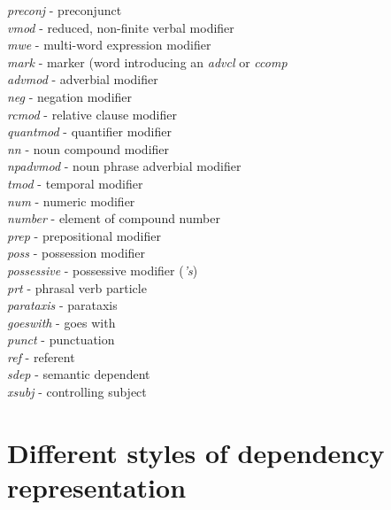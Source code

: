 \documentclass[11pt,letterpaper]{article}
\begin{document}
\begin{tabbing}
    \> \> \emph{preconj} - preconjunct \\
    \> \> \emph{vmod} - reduced, non-finite verbal modifier \\
    \> \> \emph{mwe} - multi-word expression modifier \\
    \> \> \> \emph{mark} - marker (word introducing an \emph{advcl} or
    \emph{ccomp} \\
    \> \> \emph{advmod} - adverbial modifier \\
    \> \>  \> \emph{neg} - negation modifier \\
    \> \> \emph{rcmod} - relative clause modifier \\
    \> \> \emph{quantmod} - quantifier modifier\\
   \> \> \emph{nn} - noun compound modifier \\
    \> \> \emph{npadvmod} - noun phrase adverbial modifier\\
	\> \> \> \emph{tmod} - temporal modifier \\
    \> \> \emph{num} - numeric modifier \\
    \> \> \emph{number} - element of compound number \\
    \> \> \emph{prep} - prepositional modifier \\
    \> \> \emph{poss} - possession modifier \\
    \> \> \emph{possessive} - possessive modifier (\emph{'s}) \\
    \> \> \emph{prt} - phrasal verb particle \\
\> \emph{parataxis} - parataxis \\
\> \emph{goeswith} - goes with \\
\> \emph{punct} - punctuation\\
\> \emph{ref} - referent \\
\> \emph{sdep} - semantic dependent \\
    \> \> \emph{xsubj} - controlling subject \\
\end{tabbing}


\section{Different styles of dependency representation}\label{types}
\end{document}
